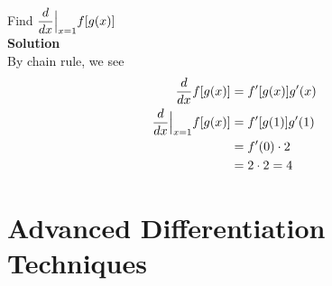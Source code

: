\documentclass{article}
\begin{document}
Find $\displaystyle \frac{d}{dx}\Bigl|_{x=1} f[ g( x)]$\\
\textbf{Solution}\\
By chain rule, we see
\begin{equation*}
\begin{aligned}
    \frac{d}{dx} f[ g( x)] & =f'[ g( x)] g'( x)\\
    \frac{d}{dx}\Bigl|_{x=1} f[ g( x)] & =f'[ g( 1)] g'( 1)\\
    & =f'( 0) \cdot 2\\
    & =2\cdot 2=4
\end{aligned}
\end{equation*}
\pagebreak
\section{Advanced Differentiation Techniques}
\end{document}

